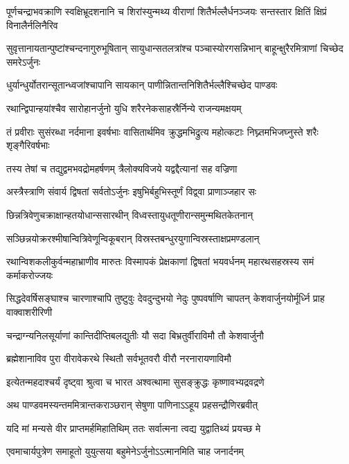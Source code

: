\threelineshloka
{पूर्णचन्द्राभवक्राणि स्वक्षिभ्रूदशनानि च}
{शिरांस्युन्मथ्य वीराणां शितैर्भल्लैर्धनञ्जयः}
{सन्तस्तार क्षितिं क्षिप्रं विनालैर्नलिनैरिव}


\threelineshloka
{सुवृत्तानायतान्पुष्टांश्चन्दनागुरुभूषितान्}
{सायुधान्सतलत्रांश्च पञ्चास्योरगसन्निभान्}
{बाहून्क्षुरैरमित्राणां चिच्छेद समरेऽर्जुनः}


\twolineshloka
{धुर्यान्धुर्योतरान्सूतान्ध्वजांश्चापानि सायकान्}
{पाणीन्नितान्तनिशितैर्भल्लैश्चिच्छेद पाण्डवः}


\twolineshloka
{रथान्द्विपान्हयांश्चैव सारोहानर्जुनो युधि}
{शरैरनेकसाहस्रैर्निन्ये राजन्यमक्षयम्}


\threelineshloka
{तं प्रवीराः सुसंरब्धा नर्दमाना इवर्षभाः}
{वासितार्थमिव क्रुद्धमभिद्रुत्य महोत्कटाः}
{निघ्न्तमभिजघ्नुस्ते शरैः शृङ्गैरिवर्षभाः}


\twolineshloka
{तस्य तेषां च तद्युद्वमभवद्रोमहर्षणम्}
{त्रैलोक्यविजये यद्वद्दैत्यानां सह वज्रिणा}


\twolineshloka
{अस्त्रैस्त्राणि संवार्य द्विषतां सर्वतोऽर्जुनः}
{इषुभिर्बहुभिस्तूर्णं विद्व्वा प्राणाञ्जहार सः}


\twolineshloka
{छिन्नत्रिवेणुचक्राक्षान्हतयोधान्ससारथीन्}
{विध्वस्तायुधतूणीरान्समुन्मथितकेतनान्}


\twolineshloka
{सञ्छिन्नयोक्ररश्मीषान्वित्रिवेणून्विकूबरान्}
{विस्रस्तबन्धुरयुगान्विस्रस्ताक्षप्रमण्डलान्}


रथान्विशकलीकुर्वन्महाभ्राणीव मारुतः
\twolineshloka
{विस्मापकं प्रेक्षकाणां द्विषतां भयवर्धनम्}
{महारथसहस्रस्य समं कर्माकरोज्जयः}


सिद्धदेवर्षिसङ्घाश्च चारणाश्चापि तुष्टुवुः
\twolineshloka
{देवदुन्दुभयो नेदुः पुष्पवर्षाणि चापतन्}
{केशवार्जुनयोर्मूर्ध्नि प्राह वाक्वाशरीरिणी}


\twolineshloka
{चन्द्राग्न्यनिलसूर्याणां कान्तिदीप्तिबलद्युतीः}
{यौ सदा बिभ्रतुर्वीराविमौ तौ केशवार्जुनौ}


\twolineshloka
{ब्रह्मेशानाविव पुरा वीरावेकरथे स्थितौ}
{सर्वभूतवरौ वीरौ नरनारायणाविमौ}


\twolineshloka
{इत्येतन्महदाश्चर्यं दृष्ट्वा श्रुत्वा च भारत}
{अश्वत्थामा सुसङ्क्रुद्धः कृष्णावभ्यद्रवद्रणे}


\twolineshloka
{अथ पाण्डवमस्यन्तममित्रान्तकराञ्छरान्}
{सेषुणा पाणिनाऽऽहूय प्रहसन्द्रौणिरब्रवीत्}


\twolineshloka
{यदि मां मन्यसे वीर प्राप्तमर्हमिहातिथिम्}
{ततः सर्वात्मना त्वद्य युद्वातिथ्यं प्रयच्छ मे}


\twolineshloka
{एवमाचार्यपुत्रेण समाहूतो युयुत्सया}
{बहुमेनेऽर्जुनोऽऽत्मानमिति चाह जनार्दनम्}



